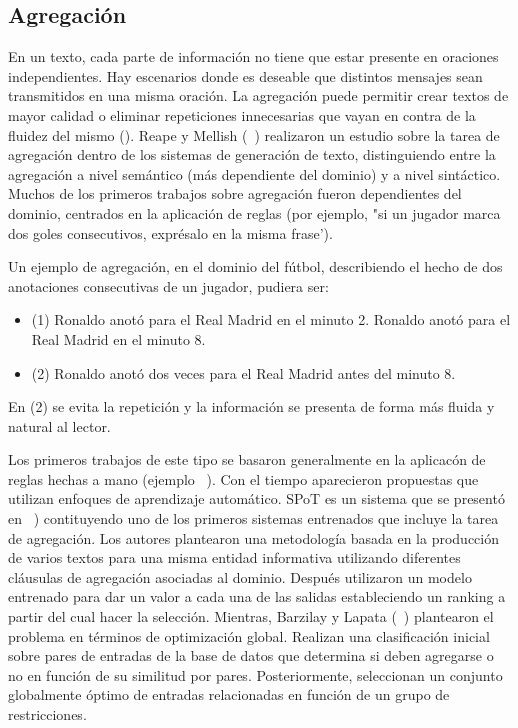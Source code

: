 \subsection{Agregación}\label{subsection:agregacion}

    En un texto, cada parte de información no tiene que estar presente en oraciones independientes. Hay escenarios donde es 
deseable que distintos mensajes sean transmitidos en una misma oraci\'on. La agregaci\'on puede permitir crear textos de mayor 
calidad o eliminar repeticiones innecesarias que vayan en contra de la fluidez del mismo (\cite{Gatt2018SurveyOT}). Reape y Mellish (~\cite{reape1999just})
realizaron un estudio sobre la tarea de agregación dentro de los sistemas de generación de texto, distinguiendo entre la agregación a nivel semántico (más dependiente del dominio)
y a nivel sintáctico. Muchos de los primeros trabajos sobre agregación fueron dependientes del dominio, centrados en la aplicación de reglas (por ejemplo, 
"si un jugador marca dos goles consecutivos, expr\'esalo en la misma frase'). 

    Un ejemplo de agregaci\'on, en el dominio del f\'utbol, describiendo el hecho de dos anotaciones consecutivas de un jugador, pudiera ser:

\begin{itemize}
    \item (1) Ronaldo anot\'o para el Real Madrid en el minuto 2. Ronaldo anot\'o para el Real Madrid en el minuto 8.
    \item (2) Ronaldo anot\'o dos veces para el Real Madrid antes del minuto 8.
\end{itemize}

    En (2) se evita la repetici\'on y la información se presenta de forma m\'as fluida y natural al lector.
    
Los primeros trabajos de este tipo se basaron generalmente en la aplicacón de reglas hechas a mano (ejemplo ~\cite{Shaw1998ClauseAU}). Con el tiempo aparecieron propuestas que 
utilizan enfoques de aprendizaje autom\'atico. SPoT es un sistema que se present\'o en ~\cite{walker2001spot}) 
contituyendo uno de los primeros sistemas entrenados que incluye la tarea de agregación. Los autores plantearon una metodolog\'ia basada en la producci\'on 
de varios textos para una misma entidad informativa utilizando diferentes cl\'ausulas de agregación asociadas al dominio. Despu\'es utilizaron un modelo 
entrenado para dar un valor a cada una de las salidas estableciendo un ranking a partir del cual hacer la selección. Mientras, Barzilay y Lapata (~\cite{Barzilay2006AggregationVS})
plantearon el problema en términos de optimización global. Realizan una clasificación inicial sobre pares de entradas de la base de datos que determina 
si deben agregarse o no en función de su similitud por pares. Posteriormente, seleccionan un conjunto globalmente óptimo de entradas relacionadas en función
de un grupo de restricciones.

